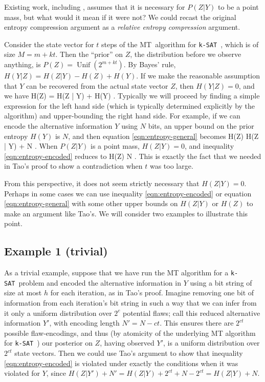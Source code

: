 \documentclass[twocolumn]{article}
\newcommand{\ksat}{\texttt{k-SAT}~}
\newcommand{\mt}{MT~}
\def\seqn#1\eeqn{\begin{align}#1\end{align}}
\begin{document}
Existing work, including \cite{achlioptas2014random}, assumes that it is necessary for $P(Z | Y)$ to be a point mass, but what would it mean if it were not?  We could recast the original entropy compression argument as a \emph{relative entropy compression} argument.

Consider the state vector for $t$ steps of the \mt algorithm for \ksat, which is of size $M = m + kt$.  Then the ``prior'' on $Z$, the distribution before we observe anything, is $P(Z) = \operatorname{Unif}(2^{m+kt})$.  By Bayes' rule, $H(Y | Z) = H(Z | Y) - H(Z) + H(Y)$.  If we make the reasonable assumption that $Y$ can be recovered from the actual state vector $Z$, then $H(Y | Z) = 0$, and we have
\seqn
  \label{eqn:entropy-general}
  H(Z) = H(Z | Y) + H(Y) .
\eeqn
Typically we will proceed by finding a simple expression for the left hand side (which is typically determined explicitly by the algorithm) and upper-bounding the right hand side.  For example, if we can encode the alternative information $Y$ using $N$ bits, an upper bound on the prior entropy $H(Y)$ is $N$, and then equation \ref{eqn:entropy-general} becomes
\seqn
  \label{eqn:entropy-encoded}
  H(Z) \leq H(Z | Y) + N .
\eeqn
When $P(Z | Y)$ is a point mass, $H(Z | Y) = 0$, and inequality \ref{eqn:entropy-encoded} reduces to
\seqn
  \label{eqn:entropy-tao}
  H(Z) \leq N .
\eeqn
This is exactly the fact that we needed in Tao's proof to show a contradiction when $t$ was too large.

From this perspective, it does not seem strictly necessary that $H(Z | Y) = 0$.  Perhaps in some cases we can use inequality \ref{eqn:entropy-encoded} or equation \ref{eqn:entropy-general} with some other upper bounds on $H(Z | Y)$ or $H(Z)$ to make an argument like Tao's.  We will consider two examples to illustrate this point.

\subsection{Example 1 (trivial)}
\label{subsec:trivial}
As a trivial example, suppose that we have run the MT algorithm for a \ksat problem and encoded the alternative information in $Y$ using a bit string of size at most $h$ for each iteration, as in Tao's proof.  Imagine removing one bit of information from each iteration's bit string in such a way that we can infer from it only a uniform distribution over $2^c$ potential flaws; call this reduced alternative information $Y'$, with encoding length $N' = N - ct$.  This ensures there are $2^{ct}$ possible flaw-encodings, and thus (by atomicity of the underlying MT algorithm for \ksat) our posterior on $Z$, having observed $Y'$, is a uniform distribution over $2^{ct}$ state vectors.  Then we could use Tao's argument to show that inequality \ref{eqn:entropy-encoded} is violated under exactly the conditions when it was violated for $Y$, since $H(Z | Y') + N' = H(Z | Y) + 2^{ct} + N - 2^{ct} = H(Z | Y) + N$.
\end{document}
